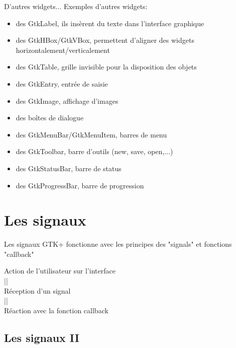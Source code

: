 \documentclass{beamer}
\begin{document}
\begin{frame}{D'autres widgets...}
    Exemples d'autres widgets:
    \begin{itemize}
        \item des GtkLabel, ils insèrent du texte dans l'interface graphique
        \item des GtkHBox/GtkVBox, permettent d'aligner des widgets horizontalement/verticalement
        \item des GtkTable, grille invisible pour la disposition des objets
        \item des GtkEntry, entrée de saisie
        \item des GtkImage, affichage d'images
        \item des boîtes de dialogue
        \item des GtkMenuBar/GtkMenuItem, barres de menu
        \item des GtkToolbar, barre d'outils (new, save, open,...)
        \item des GtkStatusBar, barre de status
        \item des GtkProgressBar, barre de progression
    \end{itemize}
\end{frame}

\section{Les signaux}

\begin{frame}{Les signaux}
    GTK+ fonctionne avec les principes des "signals" et fonctions "callback"\\
    \vspace{0.5cm}
    \begin{center}
    Action de l'utilisateur sur l'interface\\
    ||\\
    Réception d'un signal\\
    ||\\
    Réaction avec la fonction callback\\
    \end{center}
\end{frame}

\subsection{Les signaux II}
\end{document}
